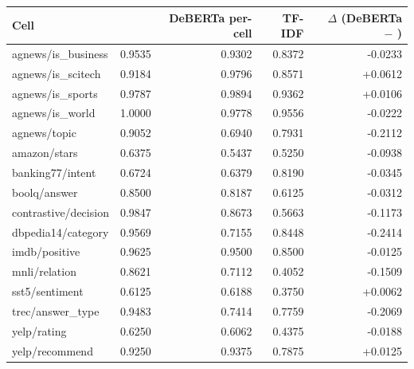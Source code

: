 \begin{widetable}
\centering
\footnotesize
\caption{Per-cell accuracy on the 1{,}176 test bundles: \vsix{}, the same-backbone per-cell
classifier (six epochs, mean of two seeds: the converged control) and the supervised TF-IDF
reference. The last column is the classifier minus \vsix{}.}
\label{tab:percell_baselines}
\begin{tabular}{lrrrr}
\toprule
Cell & \vsix{} & DeBERTa per-cell & TF-IDF & $\Delta$ (DeBERTa $-$ \vsix{}) \\
\midrule
agnews/is\_business & 0.9535 & 0.9302 & 0.8372 & -0.0233 \\
agnews/is\_scitech & 0.9184 & 0.9796 & 0.8571 & +0.0612 \\
agnews/is\_sports & 0.9787 & 0.9894 & 0.9362 & +0.0106 \\
agnews/is\_world & 1.0000 & 0.9778 & 0.9556 & -0.0222 \\
agnews/topic & 0.9052 & 0.6940 & 0.7931 & -0.2112 \\
amazon/stars & 0.6375 & 0.5437 & 0.5250 & -0.0938 \\
banking77/intent & 0.6724 & 0.6379 & 0.8190 & -0.0345 \\
boolq/answer & 0.8500 & 0.8187 & 0.6125 & -0.0312 \\
contrastive/decision & 0.9847 & 0.8673 & 0.5663 & -0.1173 \\
dbpedia14/category & 0.9569 & 0.7155 & 0.8448 & -0.2414 \\
imdb/positive & 0.9625 & 0.9500 & 0.8500 & -0.0125 \\
mnli/relation & 0.8621 & 0.7112 & 0.4052 & -0.1509 \\
sst5/sentiment & 0.6125 & 0.6188 & 0.3750 & +0.0062 \\
trec/answer\_type & 0.9483 & 0.7414 & 0.7759 & -0.2069 \\
yelp/rating & 0.6250 & 0.6062 & 0.4375 & -0.0188 \\
yelp/recommend & 0.9250 & 0.9375 & 0.7875 & +0.0125 \\
\bottomrule
\end{tabular}
\end{widetable}

